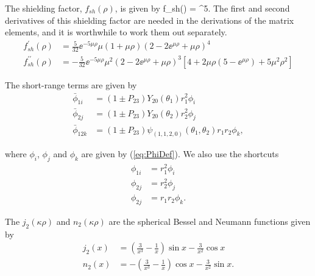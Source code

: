 \documentclass[Dissertation.tex]{subfiles}
\begin{document}
\noindent The shielding factor, $f_{sh}(\rho)$, is given by
\beq
f_{sh}(\rho) = ^5.
\label{eq:DWaveShielding}
\eeq
The first and second derivatives of this shielding factor are needed in the derivations of the matrix elements, and it is worthwhile to work them out separately.
\begin{subequations}
\label{eq:DWaveShieldingDer}
\begin{align}
f_{sh}^\prime(\rho) &= \frac{5}{32} \ee^{-5 \mu \rho} \mu (1 + \mu \rho) (2 - 2 \ee^{\mu \rho} + \mu \rho)^4 \\
f_{sh}^{\prime\prime}(\rho) &= -\frac{5}{32} \ee^{-5 \mu \rho} \mu^2 (2 - 2 \ee^{\mu \rho} + \mu \rho)^3 \left[4 + 2\mu\rho (5 - \ee^{\mu \rho}) + 5 \mu^2 \rho^2\right]
\end{align}
\end{subequations}

\noindent The short-range terms are given by
\begin{subequations}
\label{eq:DWavePhiBar}
\begin{align}
\bar{\phi}_{1i} &= \left(1 \pm P_{23}\right) Y_{20}(\theta_1) r_1^2 \phi_i \label{eq:DWavePhi1i}\\
\bar{\phi}_{2j} &= \left(1 \pm P_{23}\right) Y_{20}(\theta_2) r_2^2 \phi_j \label{eq:DWavePhi2j}\\
\bar{\phi}_{12k} &= \left(1 \pm P_{23}\right) \psi_{(1,1,2,0)}(\theta_1,\theta_2) r_1 r_2 \phi_k, \label{eq:DWavePhi12k}
\end{align}
\end{subequations}

\noindent where $\phi_i$, $\phi_j$ and $\phi_k$ are given by (\ref{eq:PhiDef}).  We also use the shortcuts
\begin{subequations}
\label{eq:DWavePhi}
\begin{align}
\phi_{1i} &= r_1^2 \phi_i \\
\phi_{2j} &= r_2^2 \phi_j \\
\phi_{2j} &= r_1 r_2 \phi_k.
\end{align}
\end{subequations}


\noindent The $j_2(\kappa\rho)$ and $n_2(\kappa\rho)$ are the spherical Bessel and Neumann functions given by \cite[p. 729]{Arfken2005}
\begin{subequations}
\label{eq:DWaveBessel}
\begin{align}
j_2(x) & = \left(\frac{3}{x^3}-\frac{1}{x}\right)\sin x - \frac{3}{x^2}\cos x \label{eq:Bessel2} \\
n_2(x) & = -\left(\frac{3}{x^3}-\frac{1}{x}\right)\cos x - \frac{3}{x^2}\sin x. \label{eq:Neumann2}
\end{align}
\end{subequations}
\end{document}
